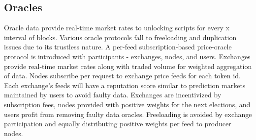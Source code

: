 \documentclass[../Bitcoin Blink.tex]{subfiles}
\begin{document}
\subsection{Oracles}

Oracle data provide real-time market rates to unlocking scripts for every x interval of blocks. Various oracle protocols \cite{chainlink} fall to freeloading and duplication issues due to its trustless nature. A per-feed subscription-based price-oracle protocol is introduced with participants - exchanges, nodes, and users. Exchanges provide real-time market rates along with traded volume for weighted aggregation of data. Nodes subscribe per request to exchange price feeds for each token id. Each exchange's feeds will have a reputation score similar to prediction markets maintained by users to avoid faulty data. Exchanges are incentivized by subscription fees, nodes provided with positive weights for the next elections, and users profit from removing faulty data oracles. Freeloading is avoided by exchange participation and equally distributing positive weights per feed to producer nodes. 
\end{document}
